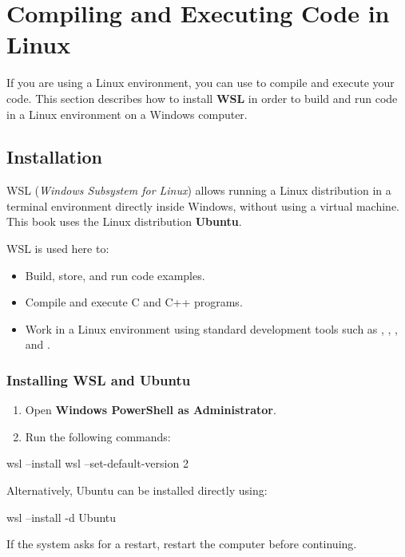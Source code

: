 
\section{Compiling and Executing Code in Linux}
\label{c1:sec:compilation}\label{c1:app:a}
If you are using a Linux environment, you can use  to compile and execute your code.
This section describes how to install \textbf{WSL} in order to build and run code in a Linux
environment on a Windows computer.

\subsection{Installation}
\label{c1:sec:wsl}
WSL (\emph{Windows Subsystem for Linux}) allows running a Linux distribution in a terminal
environment directly inside Windows, without using a virtual machine. This book uses the Linux
distribution \textbf{Ubuntu}.

WSL is used here to:
\begin{itemize}
  \item Build, store, and run code examples.
  \item Compile and execute C and C++ programs.
  \item Work in a Linux environment using standard development tools such as ,
    , , and .
\end{itemize}

\subsubsection{Installing WSL and Ubuntu}
\begin{enumerate}
  \item Open \textbf{Windows PowerShell as Administrator}.
  \item Run the following commands:
\end{enumerate}

\begin{shell}
wsl --install
wsl --set-default-version 2
\end{shell}

\noindent Alternatively, Ubuntu can be installed directly using:

\begin{shell}
wsl --install -d Ubuntu
\end{shell}

\note If the system asks for a restart, restart the computer before continuing.

